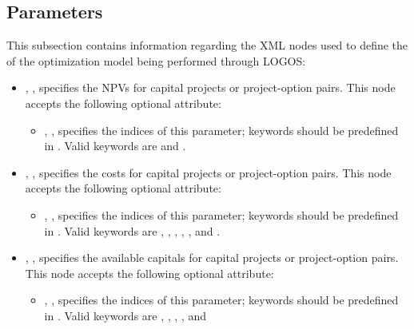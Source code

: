%
\subsection{Parameters}
\label{subsec:Parameters}
This subsection contains information regarding the XML nodes used to define the
 of the optimization model being performed through LOGOS:
\begin{itemize}
  \item {}, ,
  specifies the NPVs for capital projects or project-option pairs. This node accepts the
  following optional attribute:
  \begin{itemize}
    \item {}, ,
    specifies the indices of this parameter; keywords should be predefined in .
    Valid keywords are  and .
  \end{itemize}
  \item {}, ,
  specifies the costs for capital projects or project-option pairs. This node accepts the
  following optional attribute:
  \begin{itemize}
    \item {}, ,
    specifies the indices of this parameter; keywords should be predefined in .
    Valid keywords are , ,
    , , ,
    and .
  \end{itemize}
  \item {}, ,
  specifies the available capitals for capital projects or project-option pairs.
  This node accepts the following optional attribute:
  \begin{itemize}
    \item {}, ,
    specifies the indices of this parameter; keywords should be predefined in .
    Valid keywords are , , ,
    , and 
  \end{itemize}
\end{itemize}

